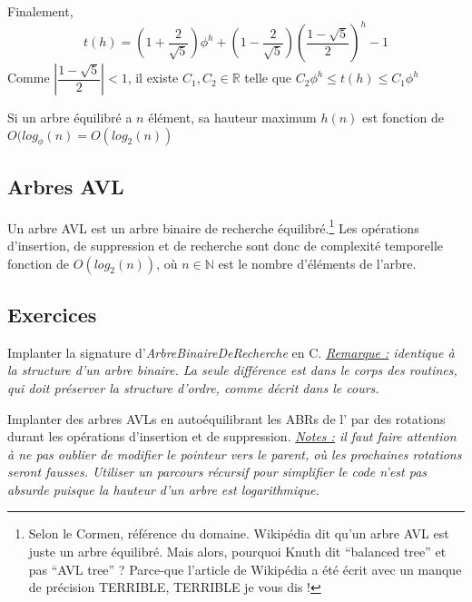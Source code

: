 \documentclass[../../../main.tex]{subfiles}
\begin{document}
Finalement,
$$t(h) = (1 + \frac{2}{\sqrt{5}})\phi^h + (1 - \frac{2}{\sqrt{5}})\left(\dfrac{1 - \sqrt{5}}{2}\right)^h - 1$$
Comme $\left|\dfrac{1 - \sqrt{5}}{2}\right| < 1$, il existe $C_1, C_2\in\mathbb{R}$ telle que $C_2\phi^h \leq t(h)\leq C_1\phi^h$

Si un arbre équilibré a $n$ élément, sa hauteur maximum $h(n)$ est fonction de $O(log_\phi(n) = O(log_2(n))$
\subsection{Arbres AVL}
 {
	Un arbre AVL est un arbre binaire de recherche équilibré.\footnote{Selon le Cormen, référence du domaine. Wikipédia dit qu'un arbre AVL est juste un arbre équilibré. Mais alors, pourquoi Knuth dit ``balanced tree'' et pas ``AVL tree'' ? Parce-que l'article de Wikipédia a été écrit avec un manque de précision TERRIBLE, TERRIBLE je vous dis !}
}
Les opérations d'insertion, de suppression et de recherche sont donc de complexité temporelle fonction de $O(log_2(n))$, où $n\in\mathbb{N}$ est le nombre d'éléments de l'arbre.
\subsection{Exercices}
 Implanter la signature d'\textit{ArbreBinaireDeRecherche} en C.\newline
\textit{\underline{Remarque :} identique à la structure d'un arbre binaire. La seule différence est dans le corps des routines, qui doit préserver la structure d'ordre, comme décrit dans le cours.}

 \newline
Implanter des arbres AVLs en autoéquilibrant les ABRs de l' par des rotations durant les opérations d'insertion et de suppression. \newline
\textit{\underline{Notes :} il faut faire attention à ne pas oublier de modifier le pointeur vers le parent, où les prochaines rotations seront fausses. Utiliser un parcours récursif pour simplifier le code n'est pas absurde puisque la hauteur d'un arbre est logarithmique.}




\end{document}
